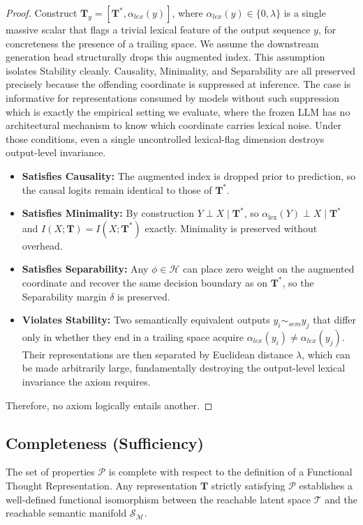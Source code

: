 \begin{proof}
Construct $\mathbf{T}_y = [\mathbf{T}^*, \alpha_{lex}(y)]$, where $\alpha_{lex}(y) \in \{0, \lambda\}$ is a single massive scalar that flags a trivial lexical feature of the output sequence $y$, for concreteness the presence of a trailing space. We assume the downstream generation head structurally drops this augmented index. This assumption isolates Stability cleanly. Causality, Minimality, and Separability are all preserved precisely because the offending coordinate is suppressed at inference. The case is informative for representations consumed by models without such suppression which is exactly the empirical setting we evaluate, where the frozen LLM has no architectural mechanism to know which coordinate carries lexical noise. Under those conditions, even a single uncontrolled lexical-flag dimension destroys output-level invariance.
\begin{itemize}
    \item \textbf{Satisfies Causality:} The augmented index is dropped prior to prediction, so the causal logits remain identical to those of $\mathbf{T}^*$.
    \item \textbf{Satisfies Minimality:} By construction $Y \perp X \mid \mathbf{T}^*$, so $\alpha_\mathrm{lex}(Y) \perp X \mid \mathbf{T}^*$ and $I(X; \mathbf{T}) = I(X; \mathbf{T}^*)$ exactly. Minimality is preserved without overhead.
    \item \textbf{Satisfies Separability:} Any $\phi \in \mathcal{H}$ can place zero weight on the augmented coordinate and recover the same decision boundary as on $\mathbf{T}^*$, so the Separability margin $\delta$ is preserved.
    \item \textbf{Violates Stability:} Two semantically equivalent outputs $y_i \sim_{sem} y_j$ that differ only in whether they end in a trailing space acquire $\alpha_{lex}(y_i) \neq \alpha_{lex}(y_j)$. Their representations are then separated by Euclidean distance $\lambda$, which can be made arbitrarily large, fundamentally destroying the output-level lexical invariance the axiom requires.
\end{itemize}

Therefore, no axiom logically entails another.
\end{proof}

\subsection{Completeness (Sufficiency)}
\label{app:completeness}

\begin{proposition}
The set of properties $\mathcal{P}$ is complete with respect to the definition of a Functional Thought Representation. Any representation $\mathbf{T}$ strictly satisfying $\mathcal{P}$ establishes a well-defined functional isomorphism between the reachable latent space $\mathcal{T}$ and the reachable semantic manifold $\mathcal{S}_{\mathcal{M}}$.
\end{proposition}

